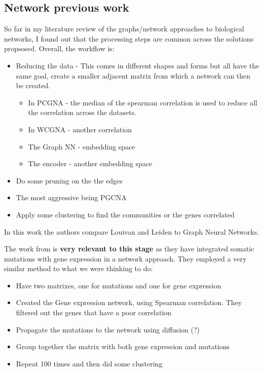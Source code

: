\subsection{Network previous work}

So far in my literature review of the graphs/network approaches to biological networks, I found out that the processing steps are common across the solutions propsosed. Overall, the workflow is:
\begin{itemize}
    \item Reducing the data - This comes in different shapes and forms but all have the same goal, create a smaller adjacent matrix from which a network can then be created.
    \begin{itemize}
        \item In PCGNA - the median of the spearman correlation is used to reduce all the correlation across the datasets.
        \item In WCGNA - another correlation
        \item The Graph NN - embedding space
        \item The encoder - another embedding space
    \end{itemize}
    \item Do some pruning on the the edges
    \item The most aggressive being PGCNA 
    \item Apply some clustering to find the communities or the genes correlated 
\end{itemize}


In this work the authors \cite{Sobolevsky2022-di} compare Louivan \cite{} and Leiden to Graph Neural Networks.



The work from \citet{He2017-dj} is \textbf{very relevant to this stage} as they have integrated somatic mutations with gene expression in a network approach.  They employed a very similar method to what we were thinking to do:
\begin{itemize}
    \item Have two matrixes, one for mutations and one for gene expression
    \item Created the Gene expression network, using Spearman correlation. They filtered out the genes that have a poor correlation
    \item Propagate the mutations to the network using diffusion (?)
    \item Group together the matrix with both gene expression and mutations
    \item Repeat 100 times and then did some clustering

\end{itemize}

